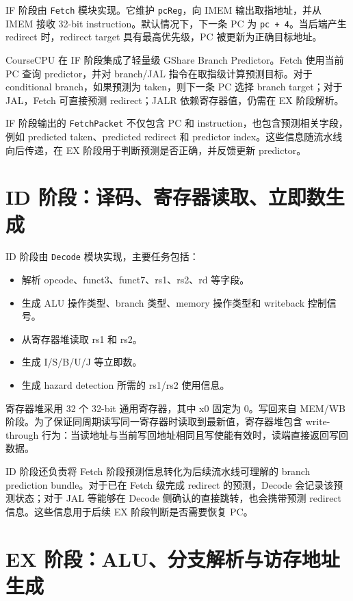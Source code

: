 \documentclass[UTF8,a4paper,12pt]{ctexrep}
\begin{document}
IF 阶段由 \texttt{Fetch} 模块实现。它维护 \texttt{pcReg}，向 IMEM 输出取指地址，并从 IMEM 接收 32-bit instruction。默认情况下，下一条 PC 为 \texttt{pc + 4}。当后端产生 redirect 时，redirect target 具有最高优先级，PC 被更新为正确目标地址。

CourseCPU 在 IF 阶段集成了轻量级 GShare Branch Predictor。Fetch 使用当前 PC 查询 predictor，并对 branch/JAL 指令在取指级计算预测目标。对于 conditional branch，如果预测为 taken，则下一条 PC 选择 branch target；对于 JAL，Fetch 可直接预测 redirect；JALR 依赖寄存器值，仍需在 EX 阶段解析。

IF 阶段输出的 \texttt{FetchPacket} 不仅包含 PC 和 instruction，也包含预测相关字段，例如 predicted taken、predicted redirect 和 predictor index。这些信息随流水线向后传递，在 EX 阶段用于判断预测是否正确，并反馈更新 predictor。

\section{ID 阶段：译码、寄存器读取、立即数生成}

ID 阶段由 \texttt{Decode} 模块实现，主要任务包括：

\begin{itemize}
  \item 解析 opcode、funct3、funct7、rs1、rs2、rd 等字段。
  \item 生成 ALU 操作类型、branch 类型、memory 操作类型和 writeback 控制信号。
  \item 从寄存器堆读取 rs1 和 rs2。
  \item 生成 I/S/B/U/J 等立即数。
  \item 生成 hazard detection 所需的 rs1/rs2 使用信息。
\end{itemize}

寄存器堆采用 32 个 32-bit 通用寄存器，其中 x0 固定为 0。写回来自 MEM/WB 阶段。为了保证同周期读写同一寄存器时读取到最新值，寄存器堆包含 write-through 行为：当读地址与当前写回地址相同且写使能有效时，读端直接返回写回数据。

ID 阶段还负责将 Fetch 阶段预测信息转化为后续流水线可理解的 branch prediction bundle。对于已在 Fetch 级完成 redirect 的预测，Decode 会记录该预测状态；对于 JAL 等能够在 Decode 侧确认的直接跳转，也会携带预测 redirect 信息。这些信息用于后续 EX 阶段判断是否需要恢复 PC。

\section{EX 阶段：ALU、分支解析与访存地址生成}
\end{document}
